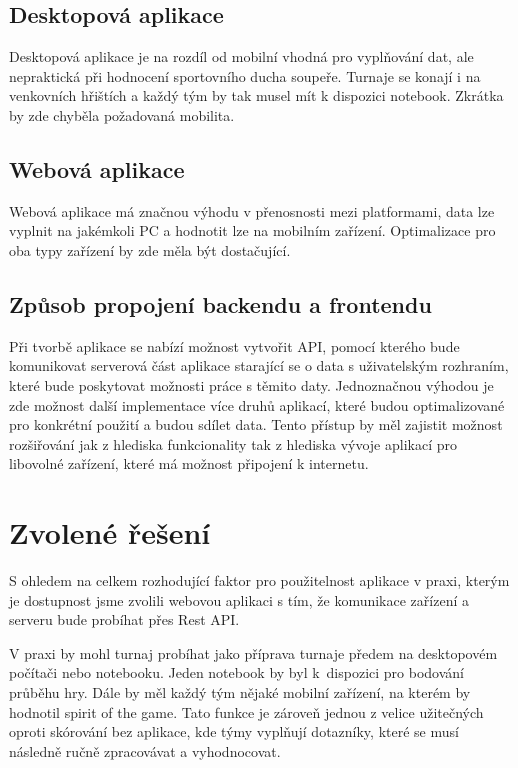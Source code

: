 \documentclass[thesis=B,czech]{FITthesis}[2012/06/26]
\begin{document}
		\subsection{Desktopová aplikace}
			Desktopová aplikace je na rozdíl od mobilní vhodná pro vyplňování dat, ale nepraktická při hodnocení sportovního ducha soupeře. Turnaje se konají i na venkovních hřištích a každý tým by tak musel mít k dispozici notebook. Zkrátka by zde chyběla požadovaná mobilita.
		
		\subsection{Webová aplikace}
			Webová aplikace má značnou výhodu v přenosnosti mezi platformami, data lze vyplnit na jakémkoli PC a hodnotit lze na mobilním zařízení. Optimalizace pro oba typy zařízení by zde měla být dostačující.
		
		\subsection{Způsob propojení backendu a frontendu}
			Při tvorbě aplikace se nabízí možnost vytvořit API, pomocí kterého bude komunikovat serverová část aplikace starající se o data s uživatelským rozhraním, které bude poskytovat možnosti práce s těmito daty. Jednoznačnou výhodou je zde možnost další implementace více druhů aplikací, které budou optimalizované pro konkrétní použití a budou sdílet data. Tento přístup by měl zajistit možnost rozšiřování jak z hlediska funkcionality tak z hlediska vývoje aplikací pro libovolné zařízení, které má možnost připojení k internetu.
		
	\section{Zvolené řešení}
		S ohledem na celkem rozhodující faktor pro použitelnost aplikace v praxi, kterým je dostupnost jsme zvolili webovou aplikaci s tím, že komunikace zařízení a serveru bude probíhat přes Rest API. %
		
		V praxi by mohl turnaj probíhat jako příprava turnaje předem na desktopovém počítači nebo notebooku. Jeden notebook by byl k~dispozici pro bodování průběhu hry. Dále by měl každý tým nějaké mobilní zařízení, na kterém by hodnotil spirit of the game. Tato funkce je zároveň jednou z velice užitečných oproti skórování bez aplikace, kde týmy vyplňují dotazníky, které se musí následně ručně zpracovávat a vyhodnocovat.
\end{document}
